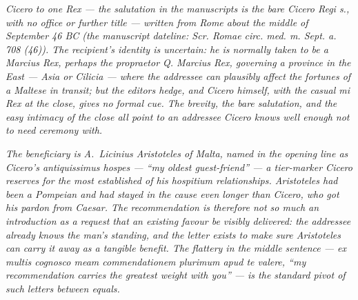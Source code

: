 
\textit{Cicero to one Rex --- the salutation in the
manuscripts is the bare \textit{Cicero Regi s.}, with no
office or further title --- written from Rome about the
middle of September 46 BC (the manuscript dateline:
\textit{Scr. Romae circ. med. m. Sept. a. 708 (46)}). The
recipient's identity is uncertain: he is normally taken to
be a Marcius Rex, perhaps the propraetor Q. Marcius Rex,
governing a province in the East --- Asia or Cilicia ---
where the addressee can plausibly affect the fortunes of
a Maltese in transit; but the editors hedge, and Cicero
himself, with the casual \textit{mi Rex} at the close,
gives no formal cue. The brevity, the bare salutation,
and the easy intimacy of the close all point to an
addressee Cicero knows well enough not to need
ceremony with.}

\textit{The beneficiary is A.\ Licinius Aristoteles of
Malta, named in the opening line as Cicero's
\textit{antiquissimus hospes} --- ``my oldest guest-friend''
--- a tier-marker Cicero reserves for the most established
of his hospitium relationships. Aristoteles had been a
Pompeian and had stayed in the cause even longer than
Cicero, who got his pardon from Caesar. The recommendation
is therefore not so much an introduction as a request
that an existing favour be visibly delivered: the
addressee already knows the man's standing, and the
letter exists to make sure Aristoteles can carry it away
as a tangible benefit. The flattery in the middle
sentence --- \textit{ex multis cognosco meam
commendationem plurimum apud te valere}, ``my
recommendation carries the greatest weight with you'' ---
is the standard pivot of such letters between equals.}
